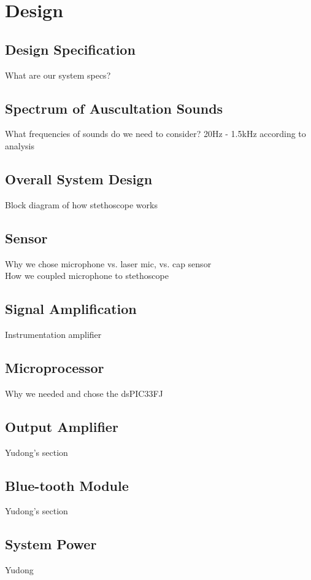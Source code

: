 \chapter{Design} \label{design}

\section{Design Specification}
What are our system specs?

\section{Spectrum of Auscultation Sounds}
What frequencies of sounds do we need to consider?
20Hz - 1.5kHz according to analysis

\section{Overall System Design}
Block diagram of how stethoscope works

\section{Sensor}
Why we chose microphone vs. laser mic, vs. cap sensor \\
How we coupled microphone to stethoscope

\section{Signal Amplification}
Instrumentation amplifier

\section{Microprocessor}
Why we needed and chose the dsPIC33FJ

\section{Output Amplifier}
Yudong's section

\section{Blue-tooth Module}
Yudong's section

\section{System Power}
Yudong